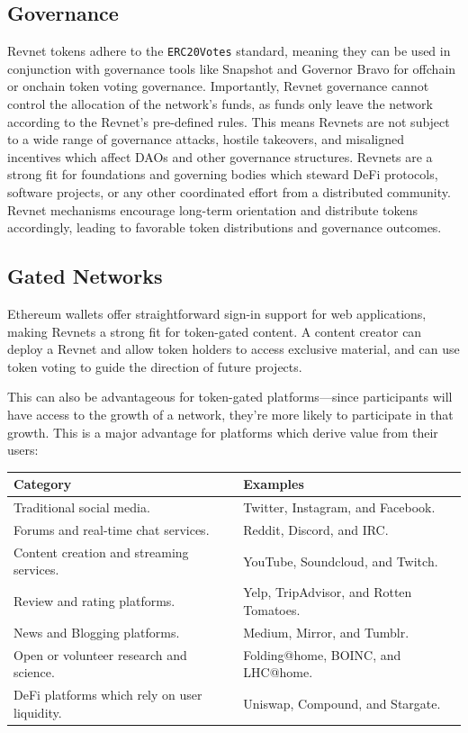 \documentclass{article}
\begin{document}
\subsection{Governance}

Revnet tokens adhere to the \texttt{ERC20Votes} standard, meaning they can be used in conjunction with governance tools like Snapshot and Governor Bravo for offchain or onchain token voting governance. Importantly, Revnet governance cannot control the allocation of the network's funds, as funds only leave the network according to the Revnet's pre-defined rules. This means Revnets are not subject to a wide range of governance attacks, hostile takeovers, and misaligned incentives which affect DAOs and other governance structures. Revnets are a strong fit for foundations and governing bodies which steward DeFi protocols, software projects, or any other coordinated effort from a distributed community. Revnet mechanisms encourage long-term orientation and distribute tokens accordingly, leading to favorable token distributions and governance outcomes.

\subsection{Gated Networks}

Ethereum wallets offer straightforward sign-in support for web applications, making Revnets a strong fit for token-gated content. A content creator can deploy a Revnet and allow token holders to access exclusive material, and can use token voting to guide the direction of future projects.

This can also be advantageous for token-gated platforms---since participants will have access to the growth of a network, they're more likely to participate in that growth. This is a major advantage for platforms which derive value from their users:

\begin{table}[h]
  \centering
  \begin{tabular}{|l|l|}
    \hline \textbf{Category} & \textbf{Examples} \\
    \hline Traditional social media. & Twitter, Instagram, and Facebook. \\
    \hline Forums and real-time chat services. & Reddit, Discord, and IRC. \\
    \hline Content creation and streaming services. & YouTube, Soundcloud, and Twitch. \\
    \hline Review and rating platforms. & Yelp, TripAdvisor, and Rotten Tomatoes. \\
    \hline News and Blogging platforms. & Medium, Mirror, and Tumblr. \\
    \hline Open or volunteer research and science. & Folding@home, BOINC, and LHC@home. \\
    \hline DeFi platforms which rely on user liquidity. & Uniswap, Compound, and Stargate. \\
    \hline
  \end{tabular}
\end{table}
\end{document}
